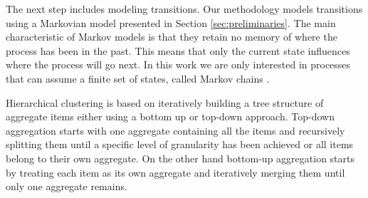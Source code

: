 The next step includes modeling transitions. Our methodology models transitions using a Markovian model
presented in Section \ref{sec:preliminaries}. The main characteristic of Markov models is that they
retain no memory of where the process has been in the past. This means that only the current state
influences where the process will go next. In this work we are only interested in processes that
can assume a finite set of states, called Markov chains \cite{norris1998markov}.

Hierarchical clustering is based on iteratively building a tree structure of aggregate items
either using a bottom up or top-down approach. Top-down aggregation starts with one aggregate containing
all the items and recursively splitting them until a specific level of granularity has been achieved or
all items belong to their own aggregate.
On the other hand bottom-up aggregation starts by treating each item as its own aggregate and iteratively
merging them until only one aggregate remains.

